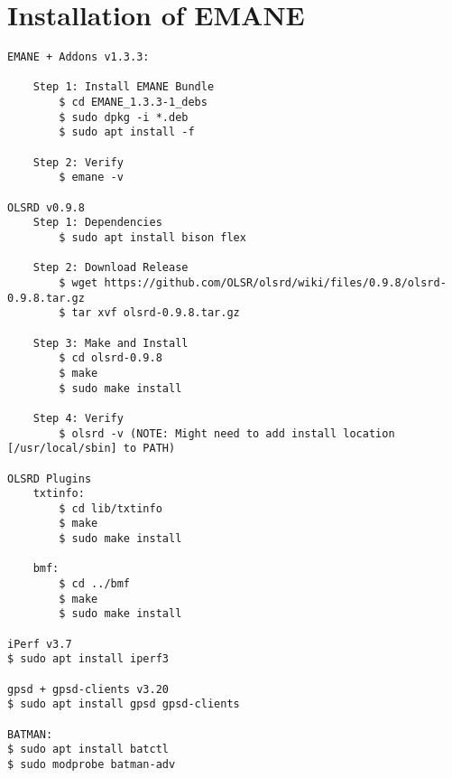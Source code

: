 \chapter{Installation of EMANE}
\label{appendixa}
\begin{verbatim}
EMANE + Addons v1.3.3:

    Step 1: Install EMANE Bundle
        $ cd EMANE_1.3.3-1_debs
        $ sudo dpkg -i *.deb
        $ sudo apt install -f

    Step 2: Verify
        $ emane -v

OLSRD v0.9.8
    Step 1: Dependencies
        $ sudo apt install bison flex 

    Step 2: Download Release
        $ wget https://github.com/OLSR/olsrd/wiki/files/0.9.8/olsrd-0.9.8.tar.gz
        $ tar xvf olsrd-0.9.8.tar.gz

    Step 3: Make and Install
        $ cd olsrd-0.9.8
        $ make
        $ sudo make install

    Step 4: Verify
        $ olsrd -v (NOTE: Might need to add install location [/usr/local/sbin] to PATH)

OLSRD Plugins
    txtinfo:
        $ cd lib/txtinfo
        $ make
        $ sudo make install

    bmf:
        $ cd ../bmf
        $ make
        $ sudo make install

iPerf v3.7
$ sudo apt install iperf3

gpsd + gpsd-clients v3.20
$ sudo apt install gpsd gpsd-clients

BATMAN:
$ sudo apt install batctl
$ sudo modprobe batman-adv
\end{verbatim}